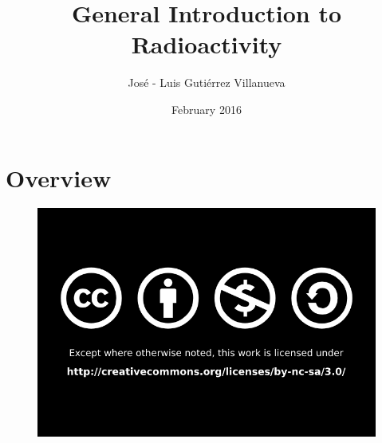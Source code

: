 \documentclass[xcolor=svgnames]{beamer}
\title
  [\hspace{1cm}  PhD lectures at IFJ-PAN - Feb 2016 \qquad Krakow]
  {General Introduction to Radioactivity}
\author
  [J.L. Guti\'errez--Villanueva]
  {Jos\'e - Luis Guti\'errez Villanueva}
\date
  {February 2016}
\institute
  {LaRUC,  University of Cantabria (Spain)}
\newcommand{\1}{\'{\i}}
\begin{document}
\maketitle

%
%

\section*{Overview}
\begin{frame}{}
\tableofcontents[hideallsubsections]
\end{frame}


%

%

%



\begin{frame}

\begin{figure}

\href{http://creativecommons.org/licenses/by-nc-sa/4.0/}{\includegraphics[scale=0.4]{figures/By_nc_sa_bw.png}}

\end{figure}

\end{frame}
\end{document}
